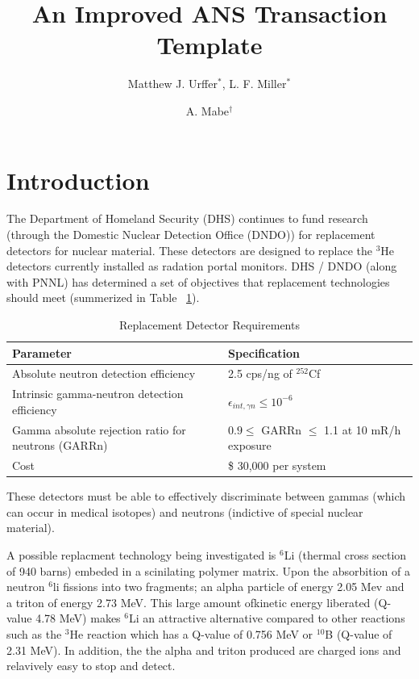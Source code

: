 \documentclass{anstrans}
\title{An Improved ANS Transaction Template}
\author{Matthew J. Urffer$^{*}$, L. F. Miller$^{*}$ \and A. Mabe$^{\dagger}$}
\institute{
$^{*}$Department of Nuclear Engineering, University of Tennessee, Knoxville, TN, 37916
\and
$^{\dagger}$Department of Chemistry, University of Tennessee, Knoxville, TN, 37916
}
\newcommand{\iso}[2]{${}^{#2}${#1}}
\begin{document}
\section{Introduction}
The Department of Homeland Security (DHS) continues to fund research (through the Domestic Nuclear Detection Office (DNDO)) for replacement detectors for nuclear material.
These detectors are designed to replace the \iso{He}{3} detectors currently installed as radation portal monitors.
DHS / DNDO (along with PNNL) has determined a set of objectives that replacement technologies should meet (summerized in Table ~\ref{tab:DHSCriteria}).
\begin{table}[h]
    \caption{Replacement Detector Requirements  }
	\centering
	\begin{tabular}{p{} | p{} }
	Parameter & Specification \\
	\hline
	\hline
	Absolute neutron detection efficiency & 2.5 cps/ng of ${}^{252}$Cf \\
	Intrinsic gamma-neutron detection efficiency & $ \epsilon_{int,\gamma n}\leq 10^{-6}$ \\
	Gamma absolute rejection ratio for neutrons (GARRn) & $ 0.9 \leq \text{ GARRn }\leq$ 1.1 at 10 mR/h exposure \\
	Cost &  \$ 30,000 per system \\
	\hline
	\end{tabular}
    \label{tab:DHSCriteria}
\end{table}
These detectors must be able to effectively discriminate between gammas (which can occur in medical isotopes) and neutrons (indictive of special nuclear material).

A possible replacment technology being investigated is \iso{Li}{6} (thermal cross section of 940 barns) embeded in a scinilating polymer matrix.
Upon the absorbition of a neutron \iso{li}{6} fissions into two fragments; an alpha particle of energy 2.05 Mev and a triton of energy 2.73 MeV.
This large amount ofkinetic energy liberated (Q-value 4.78 MeV) makes \iso{Li}{6} an attractive alternative compared to other reactions such as the \iso{He}{3} reaction which has a Q-value of 0.756 MeV or \iso{B}{10} (Q-value of 2.31 MeV).
In addition, the the alpha and triton produced are charged ions and relavively easy to stop and detect.
\end{document}
